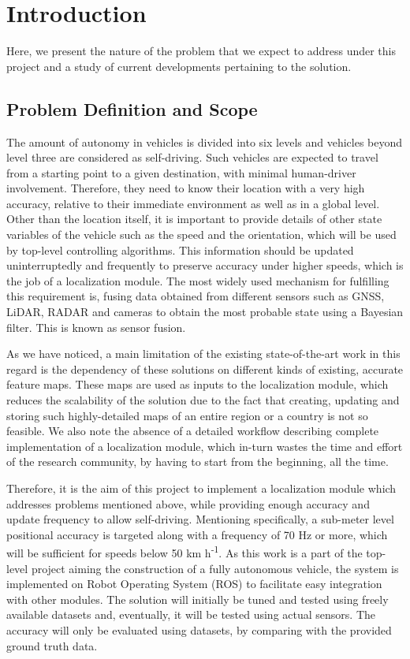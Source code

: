 \chapter{Introduction}
\glsresetall
Here, we present the nature of the problem that we expect to address under this project and a study of current developments pertaining to the solution.




\section{Problem Definition and Scope}
The amount of autonomy in vehicles is divided into six levels and vehicles beyond level three are considered as self-driving. Such vehicles are expected to travel from a starting point to a given destination, with minimal human-driver involvement. Therefore, they need to know their location with a very high accuracy, relative to their immediate environment as well as in a global level. Other than the location itself, it is important to provide details of other state variables of the vehicle such as the speed and the orientation, which will be used by top-level controlling algorithms. This information should be updated uninterruptedly and frequently to preserve accuracy under higher speeds, which is the job of a localization module. The most widely used mechanism for fulfilling this requirement is, fusing data obtained from different sensors such as \gls{GNSS}, \gls{LiDAR}, \gls{RADAR} and cameras to obtain the most probable state using a Bayesian filter. This is known as sensor fusion.

As we have noticed, a main limitation of the existing state-of-the-art work in this regard is the dependency of these solutions on different kinds of existing, accurate feature maps. These maps are used as inputs to the localization module, which reduces the scalability of the solution due to the fact that creating, updating and storing such highly-detailed maps of an entire region or a country is not so feasible. We also note the absence of a detailed workflow describing complete implementation of a localization module, which in-turn wastes the time and effort of the research community, by having to start from the beginning, all the time.

Therefore, it is the aim of this project to implement a localization module which addresses problems mentioned above, while providing enough accuracy and update frequency to allow self-driving. Mentioning specifically, a sub-meter level positional accuracy is targeted along with a frequency of 70 Hz or more, which will be sufficient for speeds below 50 km h\textsuperscript{-1}\cite{pa:ComputerArchitectures}. As this work is a part of the top-level project aiming the construction of a fully autonomous vehicle, the system is implemented on Robot Operating System (ROS) to facilitate easy integration with other modules. The solution will initially be tuned and tested using freely available datasets and, eventually, it will be tested using actual sensors. The accuracy will only be evaluated using datasets, by comparing with the provided ground truth data.

